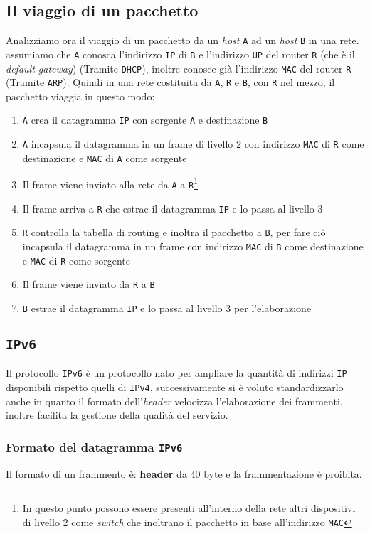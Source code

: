     \subsection{Il viaggio di un pacchetto}
        Analizziamo ora il viaggio di un pacchetto da un \textit{host} \texttt{A} ad un \textit{host} \texttt{B} in una rete. assumiamo che \texttt{A} conosca l'indirizzo \texttt{IP} di \texttt{B} e l'indirizzo \texttt{UP} del router \texttt{R} (che è il \textit{default gateway}) (Tramite \texttt{DHCP}), inoltre conosce già l'indirizzo \texttt{MAC} del router \texttt{R} (Tramite \texttt{ARP}).\newline
        Quindi in una rete costituita da \texttt{A}, \texttt{R} e \texttt{B}, con \texttt{R} nel mezzo, il pacchetto viaggia in questo modo: \begin{enumerate}
            \item \texttt{A} crea il datagramma \texttt{IP} con sorgente \texttt{A} e destinazione \texttt{B}
            \item \texttt{A} incapsula il datagramma in un frame di livello 2 con indirizzo \texttt{MAC} di \texttt{R} come destinazione e \texttt{MAC} di \texttt{A} come sorgente
            \item Il frame viene inviato alla rete da \texttt{A} a \texttt{R}\footnote{\label{netSwitch}
                In questo punto possono essere presenti all'interno della rete altri dispositivi di livello 2 come \textit{switch} che inoltrano il pacchetto in base all'indirizzo \texttt{MAC}}
            \item Il frame arriva a \texttt{R} che estrae il datagramma \texttt{IP} e lo passa al livello 3
            \item \texttt{R} controlla la tabella di routing e inoltra il pacchetto a \texttt{B}, per fare ciò incapsula il datagramma in un frame con indirizzo \texttt{MAC} di \texttt{B} come destinazione e \texttt{MAC} di \texttt{R} come sorgente
            \item Il frame viene inviato da \texttt{R} a \texttt{B}
            \item \texttt{B} estrae il datagramma \texttt{IP} e lo passa al livello 3 per l'elaborazione
        \end{enumerate}
    \subsection{\texttt{IPv6}}
        Il protocollo \texttt{IPv6} è un protocollo nato per ampliare la quantità di indirizzi \texttt{IP} disponibili rispetto quelli di \texttt{IPv4}, successivamente si è voluto standardizzarlo anche in quanto il formato dell'\textit{header} velocizza l'elaborazione dei frammenti, inoltre facilita la gestione della qualità del servizio.\subsubsection{Formato del datagramma \texttt{IPv6}}
            Il formato di un frammento è: \textbf{header} da $40$ byte e la frammentazione è proibita.
